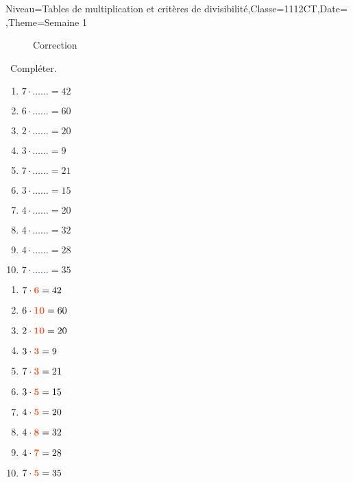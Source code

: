 \documentclass[a4paper,11pt,fleqn]{article}
\begin{document}
\begin{Maquette}[Fiche, CorrigeApres=false, CorrigeFin=true]{Niveau=Tables de multiplication et critères de divisibilité,Classe=1112CT,Date=   ,Theme=Semaine 1}
\begin{exercice}
\begin{wrapfigure}{r}{2cm}
\centering
{\hypersetup{urlcolor=black}
}
Correction
\end{wrapfigure}\ 
Compléter.
\begin{enumerate}[itemsep=2em]
	\item $7\cdot  \ldots\ldots =42$
	\item $6\cdot  \ldots\ldots =60$
	\item $2\cdot  \ldots\ldots =20$
	\item $3\cdot  \ldots\ldots =9$
	\item $7\cdot  \ldots\ldots =21$
	\item $3\cdot  \ldots\ldots =15$
	\item $4\cdot  \ldots\ldots =20$
	\item $4\cdot  \ldots\ldots =32$
	\item $4\cdot  \ldots\ldots =28$
	\item $7\cdot  \ldots\ldots =35$
\end{enumerate}
\end{exercice}

\begin{Solution}
\begin{enumerate}[itemsep=1em]
	\item $7 \cdot {\color[HTML]{f15929}\boldsymbol{6}} =42$
	\item $6 \cdot {\color[HTML]{f15929}\boldsymbol{10}} =60$
	\item $2 \cdot {\color[HTML]{f15929}\boldsymbol{10}} =20$
	\item $3 \cdot {\color[HTML]{f15929}\boldsymbol{3}} =9$
	\item $7 \cdot {\color[HTML]{f15929}\boldsymbol{3}} =21$
	\item $3 \cdot {\color[HTML]{f15929}\boldsymbol{5}} =15$
	\item $4 \cdot {\color[HTML]{f15929}\boldsymbol{5}} =20$
	\item $4 \cdot {\color[HTML]{f15929}\boldsymbol{8}} =32$
	\item $4 \cdot {\color[HTML]{f15929}\boldsymbol{7}} =28$
	\item $7 \cdot {\color[HTML]{f15929}\boldsymbol{5}} =35$
\end{enumerate}
\end{Solution}


\end{Maquette}
\end{document}
